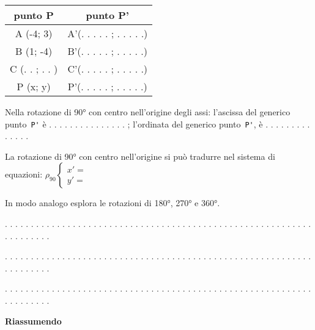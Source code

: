 \begin{tabular}{|c|c|}
\hline

punto P
 & 
punto P'
\\
\hline
A (-4; 3)
 & 
A'(. . . . . ; . . . . .)
\\
\hline
B (1; -4)
 & 
B'(. . . . . ; . . . . .)
\\
\hline
C (. . ; . . )
 & 
C'(. . . . . ; . . . . .)
\\
\hline
P (x; y)
 & 
P'(. . . . . ; . . . . .)
\\
\hline\end{tabular}


Nella rotazione di 90° con centro nell'origine degli assi:
l'ascissa del generico punto~\lstinline{P'} è . . . . . . . . . . . . . . . ;
l'ordinata del generico punto~\lstinline{P'}, è . . . . . . . . . . . . . .

La rotazione di 90° con centro nell'origine si può tradurre nel sistema di
equazioni:
\(\rho_{90} \left \{
\begin{array}{l}
x' =  \\
y' =
\end{array} \right .\)

In modo analogo esplora le rotazioni di 180°, 270° e 360°.

. . . . . . . . . . . . . . . . . . . . . . . . . . . . . . . . . . . . . . . .
. . . . . . . . . . . . . . . . . . . . . . . . . . . .

. . . . . . . . . . . . . . . . . . . . . . . . . . . . . . . . . . . . . . . .
. . . . . . . . . . . . . . . . . . . . . . . . . . . .

. . . . . . . . . . . . . . . . . . . . . . . . . . . . . . . . . . . . . . . .
. . . . . . . . . . . . . . . . . . . . . . . . . . . .

\textbf{Riassumendo}

